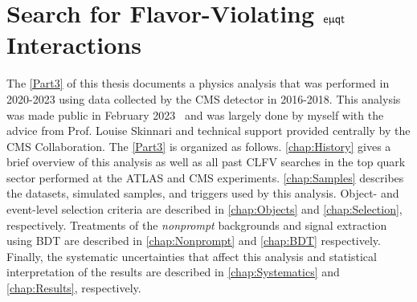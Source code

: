 \part{Search for Flavor-Violating $\textsf{e}\upmu\textsf{{q}t}$ Interactions}
\label{Part3}
The \autoref{Part3} of this thesis documents a physics analysis that was performed in 2020-2023 using data collected by the \ac{CMS} detector in 2016-2018. This analysis was made public in February 2023~\cite{CMS:2023phe} and was largely done by myself with the advice from Prof. Louise Skinnari and technical support provided centrally by the \ac{CMS} Collaboration. The \autoref{Part3} is organized as follows. \autoref{chap:History} gives a brief overview of this analysis as well as all past \ac{CLFV} searches in the top quark sector performed at the \ac{ATLAS} and \ac{CMS} experiments. \autoref{chap:Samples} describes the datasets, simulated samples, and triggers used by this analysis. Object- and event-level selection criteria are described in \autoref{chap:Objects} and \autoref{chap:Selection}, respectively. Treatments of the \emph{nonprompt} backgrounds and signal extraction using \ac{BDT} are described in \autoref{chap:Nonprompt} and \autoref{chap:BDT} respectively. Finally, the systematic uncertainties that affect this analysis and statistical interpretation of the results are described in \autoref{chap:Systematics} and \autoref{chap:Results}, respectively.









